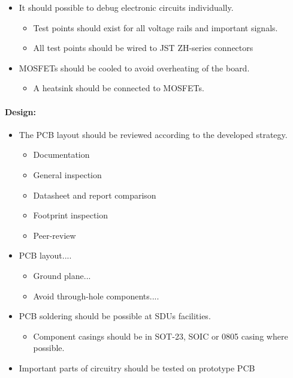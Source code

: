 \begin{itemize}
	\item It should possible to debug electronic circuits individually.
	\begin{itemize}
		\item Test points should exist for all voltage rails and important signals.
		\item All test points should be wired to JST ZH-series connectors
	\end{itemize}

	\item MOSFETs should be cooled to avoid overheating of the board.
	\begin{itemize}
		\item A heatsink should be connected to MOSFETs.
	\end{itemize}
\end{itemize}


\paragraph{Design:}
\begin{itemize}
	\item The PCB layout should be reviewed according to the developed strategy.
	\begin{itemize}
		\item Documentation
		\item General inspection
		\item Datasheet and report comparison
		\item Footprint inspection 
		\item Peer-review
	\end{itemize}
	\item PCB layout....
	\begin{itemize}
		\item Ground plane...
		\item Avoid through-hole components....
	\end{itemize}
	\item PCB soldering should be possible at SDUs facilities.
	\begin{itemize}
		\item Component casings should be in SOT-23, SOIC or 0805 casing where possible.
	\end{itemize}
	\item Important parts of circuitry should be tested on prototype PCB
\end{itemize}

	
